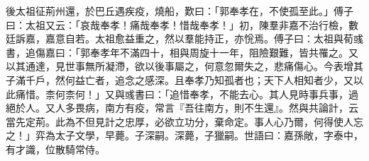 \begin{pinyinscope}
後太祖征荊州還，於巴丘遇疾疫，燒船，歎曰：「郭奉孝在，不使孤至此。」傅子曰：太祖又云：「哀哉奉孝！痛哉奉孝！惜哉奉孝！」初，陳羣非嘉不治行檢，數廷訴嘉，嘉意自若。太祖愈益重之，然以羣能持正，亦恱焉。傅子曰：太祖與荀彧書，追傷嘉曰：「郭奉孝年不滿四十，相與周旋十一年，阻險艱難，皆共罹之。又以其通達，見世事無所凝滯，欲以後事屬之，何意忽爾失之，悲痛傷心。今表增其子滿千戶，然何益亡者，追念之感深。且奉孝乃知孤者也；天下人相知者少，又以此痛惜。柰何柰何！」又與彧書曰：「追惜奉孝，不能去心。其人見時事兵事，過絕於人。又人多畏病，南方有疫，常言『吾往南方，則不生還』。然與共論計，云當先定荊。此為不但見計之忠厚，必欲立功分，棄命定。事人心乃爾，何得使人忘之！」弈為太子文學，早薨。子深嗣。深薨，子獵嗣。世語曰：嘉孫敞，字泰中，有才識，位散騎常侍。


\end{pinyinscope}